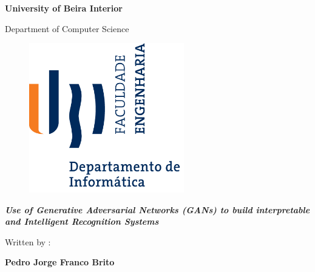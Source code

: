 
\thispagestyle{empty}
\setcounter{page}{-1}

\begin{center}
\begin{Huge}
\textbf{University of Beira Interior}
\end{Huge}
\end{center}

\begin{center}
\begin{Huge}
Department of Computer Science
\end{Huge}
\end{center}

\vspace{0,07cm}
\begin{figure}[!htb]
\centering
\includegraphics[width=191pt]{ubi-fe-di.png}
\end{figure}

\vspace{0.5cm}
\begin{center}
\begin{Large}
\textbf{\emph{Use of Generative Adversarial Networks
(GANs) to build interpretable and Intelligent Recognition Systems}}
\end{Large}
\end{center}


\vspace{0.5cm}
\begin{center}
\begin{normalsize}
\begin{large}
Written by :
\end{large}
\end{normalsize}
\end{center}

\vspace{0.2cm}
\begin{center}
\begin{large}
\textbf{Pedro Jorge Franco Brito}
\end{large}
\end{center}

